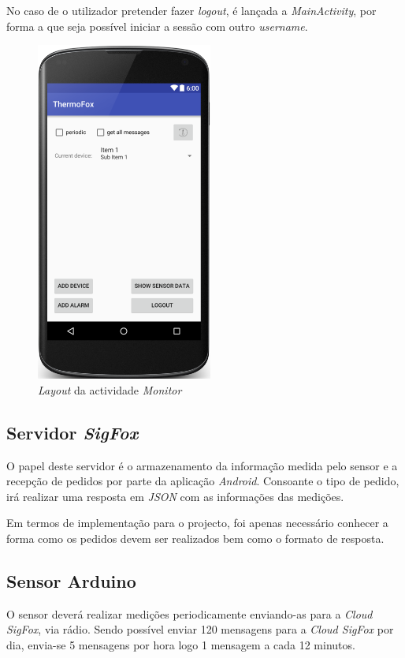 \documentclass[a4paper]{article}
\begin{document}
No caso de o utilizador pretender fazer \textit{logout}, é lançada a \textit{MainActivity}, por forma a que seja possível iniciar a sessão com outro \textit{username}.

\begin{figure}[H]
  \centering
  \includegraphics[scale=0.55]{ShowLogs.png}
  \caption{\textit{Layout} da actividade \textit{Monitor}}
  \label{fig:app_logs}
\end{figure}
\pagebreak
\subsection{Servidor \textit{SigFox}}

O papel deste servidor é o armazenamento da informação medida pelo sensor e a recepção de pedidos por parte da aplicação \textit{Android}. Consoante o tipo de pedido, irá realizar uma resposta em \textit{JSON} com as informações das medições.

Em termos de implementação para o projecto, foi apenas necessário conhecer a forma como os pedidos devem ser realizados bem como o formato de resposta.

\subsection{Sensor Arduino}

O sensor deverá realizar medições periodicamente enviando-as para a \textit{Cloud SigFox}, via rádio. Sendo possível enviar 120 mensagens para a \textit{Cloud SigFox} por dia, envia-se 5 mensagens por hora logo 1 mensagem a cada 12 minutos.
\end{document}
